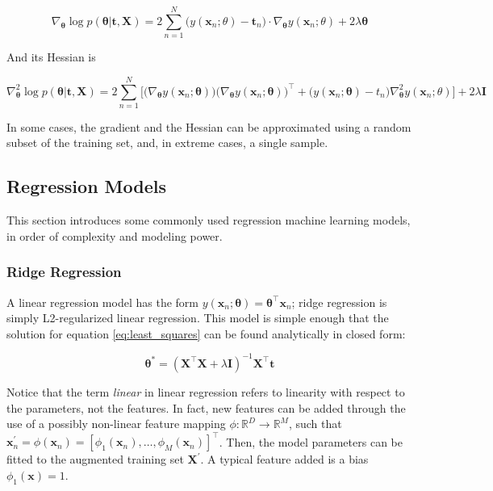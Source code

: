 \documentclass[12pt]{book}
\begin{document}
\begin{equation}
\label{eq:least_squares_gradient}
\nabla_{\bm\theta}\log p(\bm\theta\vert\bm t,\bm X)
=2\sum_{n=1}^N \big(y(\bm x_n;\theta)-\bm t_n\big)\cdot\nabla_{\bm\theta}y(\bm x_n;\theta) + 2\lambda\bm\theta
\end{equation}

And its Hessian is

\begin{equation}
\label{eq:least_squares_hessian}
\nabla^2_{\bm\theta}\log p(\bm\theta\vert\bm t,\bm X)=2\sum_{n=1}^{N}\bigg[
\big(\nabla_{\bm\theta} y(\bm x_n;\bm\theta)\big)
\big(\nabla_{\bm\theta} y(\bm x_n;\bm\theta)\big)^\intercal
+\big(y(\bm x_n;\bm\theta)-t_n\big)\nabla^2_{\bm\theta}y(\bm x_n;\theta)\bigg]+2\lambda\bm I
\end{equation}

In some cases, the gradient and the Hessian can be approximated using a random subset of the training set, and, in extreme cases, a single sample.

\subsection{Regression Models}
This section introduces some commonly used regression machine learning models, in order of complexity and modeling power.

\subsubsection{Ridge Regression}
A linear regression model has the form $y(\bm x_n;\bm\theta)=\bm\theta^\intercal\bm x_n$; ridge regression is simply L2-regularized linear regression. This model is simple enough that the solution for equation \ref{eq:least_squares} can be found analytically in closed form:

\begin{equation}
\label{eq:ridge_solution}
\bm\theta^*=(\bm X^\intercal\bm X+\lambda\bm I)^{-1}\bm X^\intercal\bm t
\end{equation}

Notice that the term \emph{linear} in linear regression refers to linearity with respect to the parameters, not the features. In fact, new features can be added through the use of a possibly non-linear feature mapping $\phi:\mathbb{R}^D\rightarrow\mathbb{R}^M$, such that $\bm x^\prime_n=\phi(\bm x_n)=\left[\phi_1(\bm x_n),\ldots,\phi_M(\bm x_n)\right]^\intercal$. Then, the model parameters can be fitted to the augmented training set $\bm X^\prime$. A typical feature added is a bias $\phi_1(\bm x)=1$.
\end{document}
